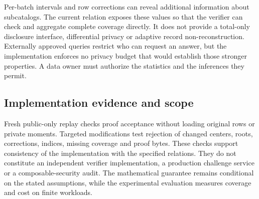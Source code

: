 Per-batch intervals and row corrections can reveal additional information
about subcatalogs. The current relation exposes these values so that the
verifier can check and aggregate complete coverage directly. It does not
provide a total-only disclosure interface, differential privacy or adaptive
record non-reconstruction. Externally approved queries restrict who can
request an answer, but the implementation enforces no privacy budget that
would establish those stronger properties. A data owner must authorize the
statistics and the inferences they permit.

\subsection{Implementation evidence and scope}
Fresh public-only replay checks proof acceptance without loading original
rows or private moments. Targeted modifications test rejection of changed
centers, roots, corrections, indices, missing coverage and proof bytes.
These checks support consistency of the implementation with the specified
relations. They do not constitute an independent verifier implementation,
a production challenge service or a composable-security audit. The
mathematical guarantee remains conditional on the stated assumptions,
while the experimental evaluation measures coverage and cost on finite
workloads.
